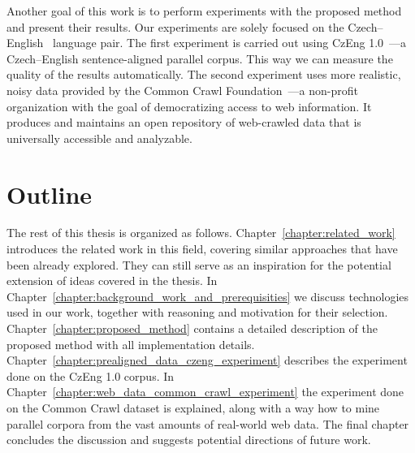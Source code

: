 Another goal of this work is to perform experiments with the proposed method and present their results. Our experiments are solely focused on the Czech--English~\cite{Bojar12_1} language pair. The first experiment is carried out using CzEng 1.0~\cite{Bojar12_2}---a Czech--English sentence-aligned parallel corpus. This way we can measure the quality of the results automatically. The second experiment uses more realistic, noisy data provided by the Common Crawl Foundation~\cite{CommonCrawl}---a non-profit organization with the goal of democratizing access to web information. It produces and maintains an open repository of web-crawled data that is universally accessible and analyzable.

\section*{Outline}

The rest of this thesis is organized as follows. Chapter~\ref{chapter:related_work} introduces the related work in this field, covering similar approaches that have been already explored. They can still serve as an inspiration for the potential extension of ideas covered in the thesis. In Chapter~\ref{chapter:background_work_and_prerequisities} we discuss technologies used in our work, together with reasoning and motivation for their selection. Chapter~\ref{chapter:proposed_method} contains a detailed description of the proposed method with all implementation details. Chapter~\ref{chapter:prealigned_data_czeng_experiment} describes the experiment done on the CzEng 1.0 corpus. In Chapter~\ref{chapter:web_data_common_crawl_experiment} the experiment done on the Common Crawl dataset is explained, along with a way how to mine parallel corpora from the vast amounts of real-world web data. The final chapter concludes the discussion and suggests potential directions of future work.